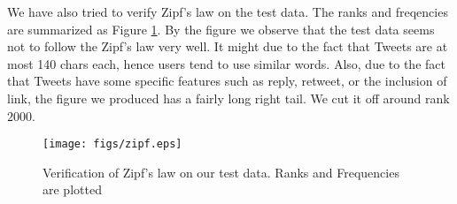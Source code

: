 \documentclass[12pt]{article}
\begin{document}
We have also tried to verify Zipf's law on the test data. The ranks and freqencies are summarized as Figure \ref{rank-freq}. By the figure we observe that the test data seems not to follow the Zipf's law very well. It might due to the fact that Tweets are at most 140 chars each, hence users tend to use similar words. Also, due to the fact that Tweets have some specific features such as reply, retweet, or the inclusion of link, the figure we produced has a fairly long right tail. We cut it off around rank $2000$.

\begin{figure}
\centering
    \texttt{[image: figs/zipf.eps]}
\caption{Verification of Zipf's law on our test data. Ranks and Frequencies are plotted}
\label{rank-freq}
\end{figure}
\end{document}
